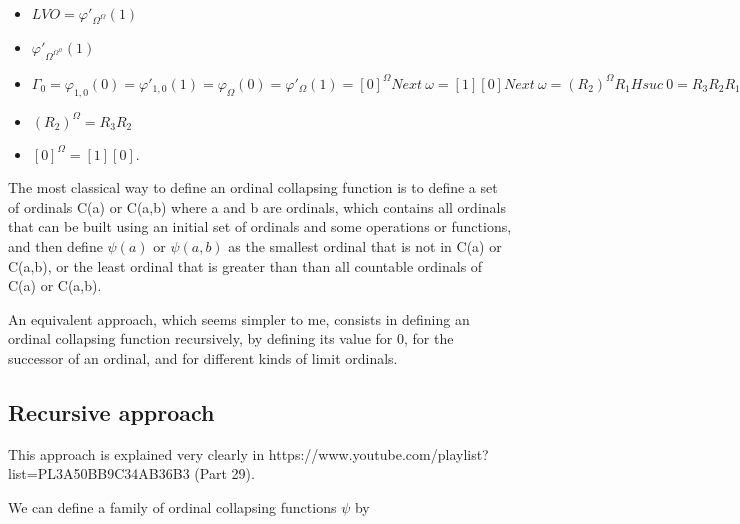 \documentclass[10pt]{article}
\begin{document}
\begin{itemize}
\item \( LVO = \varphi'_{\Omega^\Omega}(1) \)
\item \( \varphi'_{\Omega^{\Omega^\Omega}}(1) \)

\item \( \Gamma_0 = \varphi_{1,0}(0) = \varphi'_{1,0}(1) = \varphi_\Omega(0) = \varphi'_\Omega(1) = [0]^\Omega Next\ \omega = [1] [0] Next\ \omega = (R_2)^\Omega R_1 H suc\ 0 = R_3 R_2 R_1 H suc\ 0 \) 

\item \( (R_2)^\Omega = R_3 R_2 \)

\item \( [0]^\Omega = [1] [0] \).

\end{itemize}

\begin{comment}

We will now see another way to use collapsing : ordinal collapsing functions.

An ordinal collapsing function is a function that, when applied to an uncountable ordinal, gives a countable ordinal.

\end{comment}

The most classical way to define an ordinal collapsing function is to define a set of ordinals C(a) or C(a,b) where a and b are ordinals, which contains all ordinals that can be built using an initial set of ordinals and some operations or functions, and then define \( \psi(a) \) or \( \psi(a,b) \) as the smallest ordinal that is not in C(a) or C(a,b), or the least ordinal that is greater than than all countable ordinals of C(a) or C(a,b).

An equivalent approach, which seems simpler to me, consists in defining an ordinal collapsing function recursively, by defining its value for 0, for the successor of an ordinal, and for different kinds of limit ordinals.

\subsection{Recursive approach}

This approach is explained very clearly in https://www.youtube.com/playlist?list=PL3A50BB9C34AB36B3 (Part 29).

\bigskip

We can define a family of ordinal collapsing functions \( \psi \) by
\end{document}
